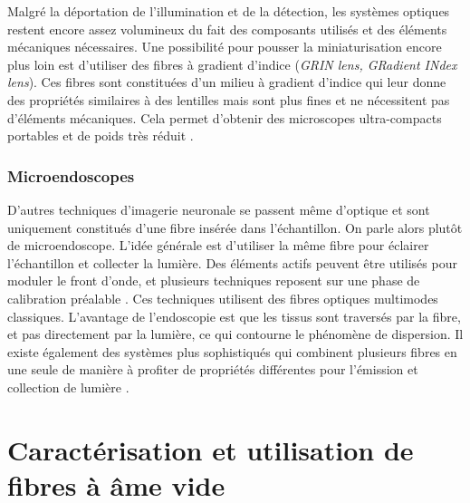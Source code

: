 Malgré la déportation de l'illumination et de la détection, les systèmes optiques restent encore assez volumineux du fait des composants utilisés et des éléments mécaniques nécessaires. Une possibilité pour pousser la miniaturisation encore plus loin est d'utiliser des fibres à gradient d'indice (\emph{GRIN lens, GRadient INdex lens}). Ces fibres sont constituées d'un milieu à gradient d'indice qui leur donne des propriétés similaires à des lentilles mais sont plus fines et ne nécessitent pas d'éléments mécaniques. Cela permet d'obtenir des microscopes ultra-compacts portables et de poids très réduit \cite{flusberg_vivo_2005}\cite{engelbrecht_ultra-compact_2008}.

\subsubsection{Microendoscopes}


D'autres techniques d'imagerie neuronale se passent même d'optique et sont uniquement constitués d'une fibre insérée dans l'échantillon. On parle alors plutôt de microendoscope. L'idée générale est d'utiliser la même fibre pour éclairer l'échantillon et collecter la lumière. Des éléments actifs peuvent être utilisés pour moduler le front d'onde, et plusieurs techniques reposent sur une phase de calibration préalable \cite{papadopoulos_high-resolution_2013}\cite{ohayon_minimally_2018}\cite{turtaev_high-fidelity_2018}. Ces techniques utilisent des fibres optiques multimodes classiques. L'avantage de l'endoscopie est que les tissus sont traversés par la fibre, et pas directement par la lumière, ce qui contourne le phénomène de dispersion. Il existe également des systèmes plus sophistiqués qui combinent plusieurs fibres en une seule de manière à profiter de propriétés différentes pour l'émission et collection de lumière \cite{andresen_two-photon_2013}\cite{kudlinski_double_2020}\cite{lombardini_high-resolution_2018}.



\section{Caractérisation et utilisation de fibres à âme vide}

